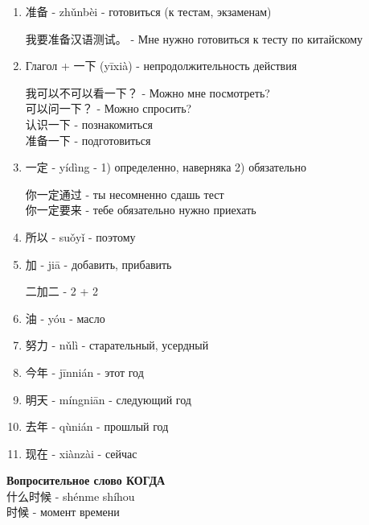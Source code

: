 \begin{newwords}
\begin{enumerate}
\begin{example}
		\end{example}
		\item 准备 - zhǔnbèi - готовиться (к тестам, экзаменам)
		\begin{example}\hfill\break
			我要准备汉语测试。 - Мне нужно готовиться к тесту по китайскому
		\end{example}
		\item Глагол + 一下 (yīxià) - непродолжительность действия
		\begin{example}
			我可以不可以看一下？ - Можно мне посмотреть?\\
			可以问一下？ - Можно спросить?\\
			认识一下 - познакомиться\\
			准备一下 - подготовиться
		\end{example}
		\item 一定 - yídìng - 1) определенно, наверняка    2) обязательно
		\begin{example}\hfill\break
			你一定通过 - ты несомненно сдашь тест\\
			你一定要来 - тебе обязательно нужно приехать
		\end{example}
		\item 所以 - suǒyǐ - поэтому
		\item 加 - jiā - добавить, прибавить
		\begin{example}
			二加二 - 2 + 2
		\end{example}
		\item 油 - yóu - масло
		\item 努力 - nǔlì - старательный, усердный
		\item 今年 - jīnnián - этот год
		\item 明天 - míngniān - следующий год
		\item 去年 - qùnián - прошлый год
		\item 现在 - xiànzài - сейчас
	\end{enumerate}
\end{newwords}
\textbf{Вопросительное слово КОГДА}\\
什么时候 - shénme shíhou\\
时候 - момент времени